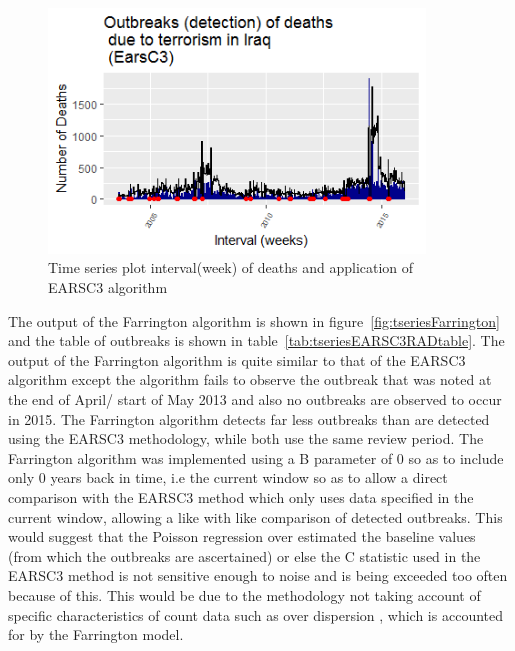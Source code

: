 \begin{figure}[t]
\includegraphics[width=10cm]{Peters_experiment_markdown_files/figure-latex/Rplot02_EarsC3.png}
\caption{Time series plot interval(week) of deaths and application of EARSC3 algorithm}
\label{fig:tseriesEARSC3RAD}
\centering
\end{figure}

The output of the Farrington algorithm is shown in figure~\ref{fig:tseriesFarrington} and the table of outbreaks is shown in table~\ref{tab:tseriesEARSC3RADtable}. The output of the Farrington algorithm is quite similar to that of the EARSC3 algorithm except the algorithm fails to observe the outbreak that was noted at the end of April/ start of May 2013 and also no outbreaks are observed to occur in 2015. The Farrington algorithm detects far less outbreaks than are detected using the EARSC3 methodology, while both use the same review period. The Farrington algorithm was implemented using a B parameter of 0 so as to  include only 0 years back in time, i.e the current window so as to allow a direct comparison with the EARSC3 method which only uses data specified in the current window, allowing a like with like comparison of detected outbreaks. This would suggest that the Poisson regression over estimated the baseline values (from which the outbreaks are ascertained) or else the C statistic used in the EARSC3 method is not sensitive enough to noise and is being exceeded too often because of this. This would be due to the methodology not taking account of specific characteristics of count data such as over dispersion \citep{shmueli2011statistica}, which is accounted for by the Farrington model.

